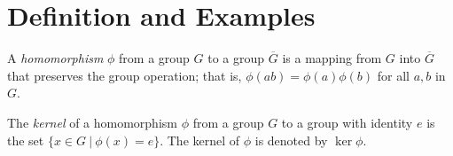 \section{Definition and Examples}

\begin{definition}
	A \textit{homomorphism} $\phi$ from a group $G$ to a group $\overline{G}$ is a mapping from $G$ into $\overline{G}$ that preserves the group operation; that is, $\phi(ab) = \phi(a)\phi(b)$ for all $a, b$ in $G$.
\end{definition}

\begin{definition}
	The \textit{kernel} of a homomorphism $\phi$ from a group $G$ to a group with identity $e$ is the set $\{x \in G\ \vert\ \phi(x)=e\}$. The kernel of $\phi$ is denoted by $\ker\phi$.
\end{definition}
